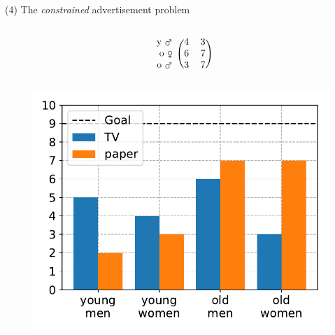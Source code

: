 \documentclass[11pt, aspectratio=149]{beamer}
\theoremstyle{plain}
\begin{document}
\begin{frame}[fragile, t]{(4) The \emph{constrained} advertisement problem}
\begin{columns}
\begin{column}{0.4\textwidth}
\[\begin{blockarray}{rcc}
\begin{block}{r(cc)}
			\text{y \mars}  & 4 &  3 \\
			\text{o \female}  & 6 &  7 \\
			\text{o \mars}  & 3 &  7 \\
			\end{block}
			\end{blockarray}
			\]
			\vspace*{-3em}
			\begin{figure}
				\centering
				\includegraphics[width=1.0\linewidth]{figs/advertisement_statement.pdf}
			\end{figure}
		\end{column}
	\end{columns}
\end{frame}
\end{document}
